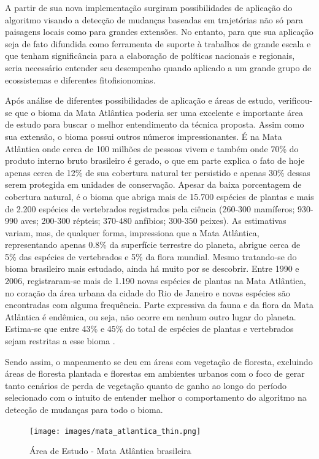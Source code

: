 \documentclass[12pt,a4paper]{article}
\begin{document}
A partir de sua nova implementação surgiram possibilidades de aplicação do algoritmo visando a detecção de mudanças baseadas em trajetórias não só para paisagens locais como para grandes extensões. No entanto, para que sua aplicação seja de fato difundida como ferramenta de suporte à trabalhos de grande escala e que tenham significância para a elaboração de políticas nacionais e regionais, seria necessário entender seu desempenho quando aplicado a um grande grupo de ecossistemas e diferentes fitofisionomias.

Após análise de diferentes possibilidades de aplicação e áreas de estudo, verificou-se que o bioma da Mata Atlântica poderia ser uma excelente e importante área de estudo para buscar o melhor entendimento da técnica proposta. Assim como sua extensão, o bioma possui outros números impressionantes. É na Mata Atlântica onde cerca de 100 milhões de pessoas vivem e também onde 70\% do produto interno bruto brasileiro é gerado, o que em parte explica o fato de hoje apenas cerca de 12\% de sua cobertura natural ter persistido e apenas 30\% dessas serem protegida em unidades de conservação. Apesar da baixa porcentagem de cobertura natural, é o bioma que abriga mais de 15.700 espécies de plantas e mais de 2.200 espécies de vertebrados registrados pela ciência (260-300 mamíferos; 930-990 aves; 200-300 répteis; 370-480 anfíbios; 300-350 peixes). As estimativas variam, mas, de qualquer forma, impressiona que a Mata Atlântica, representando apenas 0.8\% da superfície terrestre do planeta, abrigue cerca de 5\% das espécies de vertebrados e 5\% da flora mundial. Mesmo tratando-se do bioma brasileiro mais estudado, ainda há muito por se descobrir. Entre 1990 e 2006, registraram-se mais de 1.190 novas espécies de plantas na Mata Atlântica, no coração da área urbana da cidade do Rio de Janeiro e novas espécies são encontradas com alguma frequência. Parte expressiva da fauna e da flora da Mata Atlântica é endêmica, ou seja, não ocorre em nenhum outro lugar do planeta. Estima-se que entre 43\% e 45\% do total de espécies de plantas e vertebrados sejam restritas a esse bioma \citep{scarano2014}.

Sendo assim, o mapeamento se deu em áreas com vegetação de floresta, excluindo áreas de floresta plantada e florestas em ambientes urbanos com o foco de gerar tanto cenários de perda de vegetação quanto de ganho ao longo do período selecionado com o intuito de entender melhor o comportamento do algoritmo na detecção de mudanças para todo o bioma. 

\begin{figure}[h!]
    \centering
    \texttt{[image: images/mata\_atlantica\_thin.png]}
    \caption{Área de Estudo - Mata Atlântica brasileira}
    \label{fig:mata_atlantica}
\end{figure}
\end{document}
